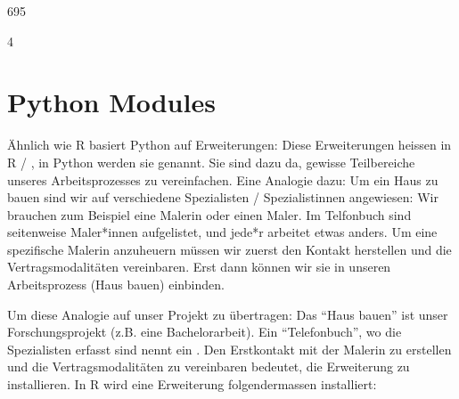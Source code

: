 \documentclass[letterpaper,10pt,english]{sphinxmanual}
\begin{document}
\begin{sphinxVerbatim}[commandchars=\\\{\}]
695
\end{sphinxVerbatim}

\begin{sphinxVerbatim}[commandchars=\\\{\}]
\end{sphinxVerbatim}

\begin{sphinxVerbatim}[commandchars=\\\{\}]
4
\end{sphinxVerbatim}

\begin{sphinxVerbatim}[commandchars=\\\{\}]
\end{sphinxVerbatim}


\chapter{Python Modules}
\label{\detokenize{01_03_Python_Module:python-modules}}\label{\detokenize{01_03_Python_Module::doc}}
Ähnlich wie R basiert Python auf Erweiterungen: Diese Erweiterungen heissen in R  / , in Python werden sie  genannt. Sie sind dazu da, gewisse Teilbereiche unseres Arbeitsprozesses zu vereinfachen. Eine Analogie dazu: Um ein Haus zu bauen sind wir auf verschiedene Spezialisten / Spezialistinnen angewiesen: Wir brauchen zum Beispiel eine Malerin oder einen Maler. Im Telfonbuch sind seitenweise Maler*innen aufgelistet, und jede*r arbeitet etwas anders. Um eine spezifische Malerin anzuheuern müssen wir zuerst den Kontakt herstellen und die Vertragsmodalitäten vereinbaren. Erst dann können wir sie in unseren Arbeitsprozess (Haus bauen) einbinden.

Um diese Analogie auf unser Projekt zu übertragen: Das “Haus bauen” ist unser Forschungsprojekt (z.B. eine Bachelorarbeit). Ein “Telefonbuch”, wo die Spezialisten erfasst sind nennt ein . Den Erstkontakt mit der Malerin zu erstellen und die Vertragsmodalitäten zu vereinbaren bedeutet, die Erweiterung zu installieren. In R wird eine Erweiterung folgendermassen installiert:

\begin{sphinxVerbatim}[commandchars=\\\{\}]
\end{sphinxVerbatim}
\end{document}
